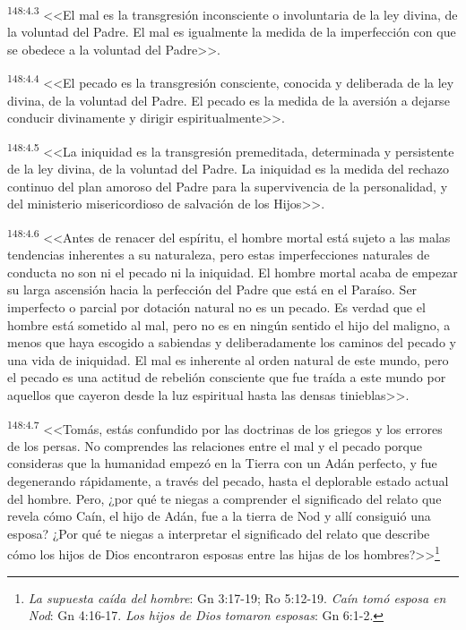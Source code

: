 \par 
\textsuperscript{148:4.3} <<El mal es la transgresión inconsciente o involuntaria de la ley divina, de la voluntad del Padre. El mal es igualmente la medida de la imperfección con que se obedece a la voluntad del Padre>>.

\par 
\textsuperscript{148:4.4} <<El pecado es la transgresión consciente, conocida y deliberada de la ley divina, de la voluntad del Padre. El pecado es la medida de la aversión a dejarse conducir divinamente y dirigir espiritualmente>>.

\par 
\textsuperscript{148:4.5} <<La iniquidad es la transgresión premeditada, determinada y persistente de la ley divina, de la voluntad del Padre. La iniquidad es la medida del rechazo continuo del plan amoroso del Padre para la supervivencia de la personalidad, y del ministerio misericordioso de salvación de los Hijos>>.

\par 
\textsuperscript{148:4.6} <<Antes de renacer del espíritu, el hombre mortal está sujeto a las malas tendencias inherentes a su naturaleza, pero estas imperfecciones naturales de conducta no son ni el pecado ni la iniquidad. El hombre mortal acaba de empezar su larga ascensión hacia la perfección del Padre que está en el Paraíso. Ser imperfecto o parcial por dotación natural no es un pecado. Es verdad que el hombre está sometido al mal, pero no es en ningún sentido el hijo del maligno, a menos que haya escogido a sabiendas y deliberadamente los caminos del pecado y una vida de iniquidad. El mal es inherente al orden natural de este mundo, pero el pecado es una actitud de rebelión consciente que fue traída a este mundo por aquellos que cayeron desde la luz espiritual hasta las densas tinieblas>>.

\par 
\textsuperscript{148:4.7} <<Tomás, estás confundido por las doctrinas de los griegos y los errores de los persas. No comprendes las relaciones entre el mal y el pecado porque consideras que la humanidad empezó en la Tierra con un Adán perfecto, y fue degenerando rápidamente, a través del pecado, hasta el deplorable estado actual del hombre. Pero, ¿por qué te niegas a comprender el significado del relato que revela cómo Caín, el hijo de Adán, fue a la tierra de Nod y allí consiguió una esposa? ¿Por qué te niegas a interpretar el significado del relato que describe cómo los hijos de Dios encontraron esposas entre las hijas de los hombres?>>\footnote{\textit{La supuesta caída del hombre}: Gn 3:17-19; Ro 5:12-19. \textit{Caín tomó esposa en Nod}: Gn 4:16-17. \textit{Los hijos de Dios tomaron esposas}: Gn 6:1-2.}

